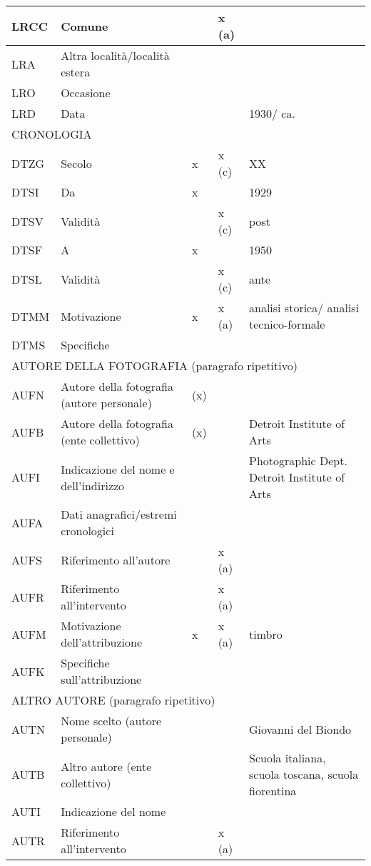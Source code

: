 \begin{center}
\begin{longtable}{ | p{1cm} | p{4cm} | p{.6cm} | p{.6cm} | p{5cm} | }
  LRCC & Comune &  & x (a) &  \\ \hline
  LRA & Altra località/località estera &  &  &  \\ \hline
  LRO & Occasione &  &  &  \\ \hline
  LRD & Data &  &  & 1930/ ca. \\ \hline
  \multicolumn{5}{|l|}{\cellcolor{lightcyan}CRONOLOGIA} \\ \hline
  DTZG & Secolo & x & x (c) & XX \\ \hline
  DTSI & Da & x &  & 1929 \\ \hline
  DTSV & Validità &  & x (c) & post \\ \hline
  DTSF & A & x &  & 1950 \\ \hline
  DTSL & Validità &  & x (c) & ante \\ \hline
  DTMM & Motivazione & x & x (a) & analisi storica/ analisi tecnico-formale \\ \hline
  DTMS & Specifiche &  &  &  \\ \hline
  \multicolumn{5}{|l|}{\cellcolor{lightcyan}AUTORE DELLA FOTOGRAFIA (paragrafo ripetitivo)} \\ \hline
  AUFN & Autore della fotografia (autore personale) & (x) &  &  \\ \hline
  AUFB & Autore della fotografia (ente collettivo) & (x) &  & Detroit Institute of Arts \\ \hline
  AUFI & Indicazione del nome e dell’indirizzo &  &  & Photographic Dept. Detroit Institute of Arts \\ \hline
  AUFA & Dati anagrafici/estremi cronologici &  &  &  \\ \hline
  AUFS & Riferimento all’autore &  & x (a) &  \\ \hline
  AUFR & Riferimento all’intervento &  & x (a) &  \\ \hline
  AUFM & Motivazione dell’attribuzione & x & x (a) & timbro \\ \hline
  AUFK & Specifiche sull’attribuzione &  &  &  \\ \hline
  \multicolumn{5}{|l|}{\cellcolor{lightcyan}ALTRO AUTORE (paragrafo ripetitivo)} \\ \hline
  AUTN & Nome scelto (autore personale) &  &  & Giovanni del Biondo \\ \hline
  AUTB & Altro autore (ente collettivo) &  &  & Scuola italiana, scuola toscana, scuola fiorentina \\ \hline
  AUTI & Indicazione del nome &  &  &  \\ \hline
  AUTR & Riferimento all’intervento &  & x (a) &  \\ \hline

\end{longtable}
\end{center}
